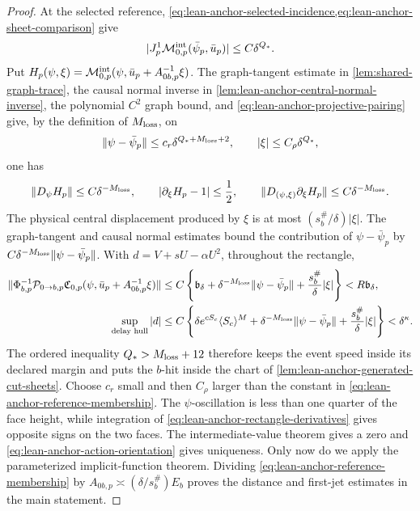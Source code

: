 \begin{proof}
At the selected reference,
\cref{eq:lean-anchor-selected-incidence,eq:lean-anchor-sheet-comparison}
give
\begin{equation}
 |J_p^1\mathcal M_{0,p}^{\rm int}(\bar\psi_p,\bar u_p)|
 \le C\delta^{Q_*}.
 \label{eq:lean-anchor-reference-membership}
\end{equation}
Put
\(H_p(\psi,\xi)=\mathcal M_{0,p}^{\rm int}
 (\psi,\bar u_p+A_{0b,p}^{-1}\xi)\).
The graph-tangent estimate in \cref{lem:shared-graph-trace}, the causal
normal inverse in \cref{lem:lean-anchor-central-normal-inverse}, the
polynomial \(C^2\) graph bound, and
\cref{eq:lean-anchor-projective-pairing} give, by the definition of
\(M_{\rm loss}\), on
\[
 \|\psi-\bar\psi_p\|\le c_r\delta^{Q_*+M_{\rm loss}+2},
 \qquad |\xi|\le C_\rho\delta^{Q_*},
\]
one has
\begin{equation}
 \|D_\psi H_p\|\le C\delta^{-M_{\rm loss}},\qquad
 |\partial_\xi H_p-1|\le\frac12,\qquad
 \|D_{(\psi,\xi)}\partial_\xi H_p\|
       \le C\delta^{-M_{\rm loss}}.
 \label{eq:lean-anchor-rectangle-derivatives}
\end{equation}
The physical central displacement produced by \(\xi\) is at most
\((s_b^\#/\delta)|\xi|\).  The graph-tangent and causal normal estimates
bound the contribution of \(\psi-\bar\psi_p\) by
\(C\delta^{-M_{\rm loss}}\|\psi-\bar\psi_p\|\).  With
\(d=V+sU-\alpha U^2\), throughout the
rectangle,
\begin{align}
 \|\Phi_{b,p}^{-1}\mathcal P_{0\to b,p}
       \mathfrak C_{0,p}(\psi,\bar u_p+A_{0b,p}^{-1}\xi)\|
 &\le C\left\{\mathfrak b_\delta
       +\delta^{-M_{\rm loss}}\|\psi-\bar\psi_p\|
       +\frac{s_b^\#}{\delta}|\xi|\right\}
 <R\mathfrak b_\delta,\notag\\
 \sup_{\text{delay hull}}|d|
 &\le C\left\{\delta e^{cS_c}\langle S_c\rangle^M
       +\delta^{-M_{\rm loss}}\|\psi-\bar\psi_p\|
       +\frac{s_b^\#}{\delta}|\xi|\right\}<\delta^\kappa.
 \label{eq:lean-anchor-rectangle-containment}
\end{align}
The ordered inequality \(Q_*>M_{\rm loss}+12\) therefore keeps the event
speed inside its declared margin and puts the \(b\)-hit inside the chart
of \cref{lem:lean-anchor-generated-cut-sheets}.  Choose \(c_r\) small and
then \(C_\rho\) larger than the
constant in \cref{eq:lean-anchor-reference-membership}.  The
\(\psi\)-oscillation is less than one quarter of the face height, while
integration of \cref{eq:lean-anchor-rectangle-derivatives} gives opposite
signs on the two faces.  The intermediate-value theorem gives a zero and
\cref{eq:lean-anchor-action-orientation} gives uniqueness.  Only now do we
apply the parameterized implicit-function theorem.  Dividing
\cref{eq:lean-anchor-reference-membership} by
\(A_{0b,p}\asymp(\delta/s_b^\#)E_b\) proves the distance and first-jet
estimates in the main statement.
\end{proof}

